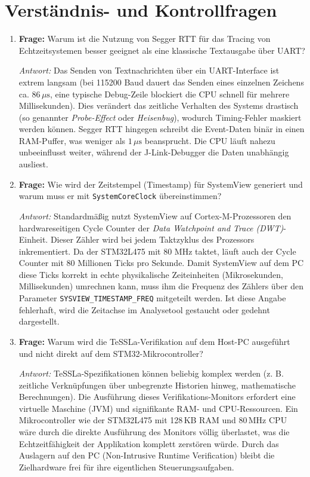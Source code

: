 \section{Verständnis- und Kontrollfragen}
\begin{enumerate}
    \item \textbf{Frage:} Warum ist die Nutzung von Segger RTT für das Tracing von Echtzeitsystemen besser geeignet als eine klassische Textausgabe über UART?
    
    \textit{Antwort:} Das Senden von Textnachrichten über ein UART-Interface ist extrem langsam (bei 115200 Baud dauert das Senden eines einzelnen Zeichens ca. $86\,\mu\text{s}$, eine typische Debug-Zeile blockiert die CPU schnell für mehrere Millisekunden). Dies verändert das zeitliche Verhalten des Systems drastisch (so genannter \textit{Probe-Effect} oder \textit{Heisenbug}), wodurch Timing-Fehler maskiert werden können. Segger RTT hingegen schreibt die Event-Daten binär in einen RAM-Puffer, was weniger als $1\,\mu\text{s}$ beansprucht. Die CPU läuft nahezu unbeeinflusst weiter, während der J-Link-Debugger die Daten unabhängig ausliest.
    
    \item \textbf{Frage:} Wie wird der Zeitstempel (Timestamp) für SystemView generiert und warum muss er mit \lstinline|SystemCoreClock| übereinstimmen?
    
    \textit{Antwort:} Standardmäßig nutzt SystemView auf Cortex-M-Prozessoren den hardwareseitigen Cycle Counter der \textit{Data Watchpoint and Trace (DWT)}-Einheit. Dieser Zähler wird bei jedem Taktzyklus des Prozessors inkrementiert. Da der STM32L475 mit 80 MHz taktet, läuft auch der Cycle Counter mit 80 Millionen Ticks pro Sekunde. Damit SystemView auf dem PC diese Ticks korrekt in echte physikalische Zeiteinheiten (Mikrosekunden, Millisekunden) umrechnen kann, muss ihm die Frequenz des Zählers über den Parameter \lstinline|SYSVIEW_TIMESTAMP_FREQ| mitgeteilt werden. Ist diese Angabe fehlerhaft, wird die Zeitachse im Analysetool gestaucht oder gedehnt dargestellt.
    
    \item \textbf{Frage:} Warum wird die TeSSLa-Verifikation auf dem Host-PC ausgeführt und nicht direkt auf dem STM32-Mikrocontroller?
    
    \textit{Antwort:} TeSSLa-Spezifikationen können beliebig komplex werden (z. B. zeitliche Verknüpfungen über unbegrenzte Historien hinweg, mathematische Berechnungen). Die Ausführung dieses Verifikations-Monitors erfordert eine virtuelle Maschine (JVM) und signifikante RAM- und CPU-Ressourcen. Ein Mikrocontroller wie der STM32L475 mit 128\,KB RAM und 80\,MHz CPU wäre durch die direkte Ausführung des Monitors völlig überlastet, was die Echtzeitfähigkeit der Applikation komplett zerstören würde. Durch das Auslagern auf den PC (Non-Intrusive Runtime Verification) bleibt die Zielhardware frei für ihre eigentlichen Steuerungsaufgaben.
\end{enumerate}
